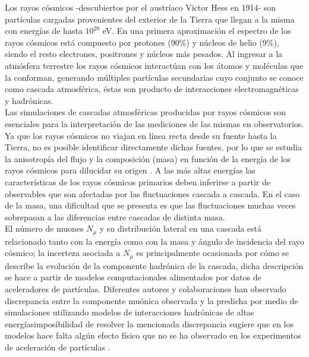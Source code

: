 \DIFdelbegin %
\DIFdelend \DIFaddbegin {}
\vspace{-5mm}

\DIFaddend 

Los rayos cósmicos -descubiertos por el austríaco Victor Hess en 1914- son partículas cargadas provenientes del exterior de la Tierra que llegan a la misma con energías de hasta $10^{20}$ eV. En una primera aproximaci\'on el espectro de los rayos c\'osmicos est\'a compuesto por protones (90\%) y núcleos de helio (9\%), siendo el resto electrones, positrones y núcleos más pesados. Al ingresar a la atmósfera terrestre los rayos c\'osmicos interactúan con los átomos y moléculas que la conforman, generando m\'ultiples partículas secundarias cuyo conjunto se conoce como cascada atmosf\'erica, éstas son producto de interacciones electromagnéticas y hadrónicas. \\

Las simulaciones de cascadas atmosf\'ericas producidas por rayos c\'osmicos son esenciales para la interpretaci\'on de las mediciones de las mismas en observatorios. Ya que los rayos c\'osmicos no viajan en l\'inea recta desde su fuente hasta la Tierra, no es posible identificar directamente dichas fuentes, por lo que se estudia la anisotrop\'ia del flujo y la composici\'on (masa) en funci\'on de la energ\'ia de los rayos c\'osmicos para dilucidar su origen \cite{Albrecht2021}. A las m\'as altas energ\'ias las caracter\'isticas de los rayos c\'osmicos primarios deben inferirse a partir de observables que son afectadas por las fluctuaciones cascada a cascada. En el caso de la masa, una dificultad que se presenta es que las fluctuaciones muchas veces sobrepasan a las diferencias entre cascadas de distinta masa. \\

El n\'umero de muones $N_{\mu}$ y su distribuci\'on lateral en una cascada est\'a relacionado tanto con la energ\'ia como con la masa y \'angulo de incidencia del rayo c\'osmico; la incerteza asociada a $N_{\mu}$ es principalmente ocasionada por c\'omo se describe la evoluci\'on de la componente hadr\'onica de la cascada, dicha descripci\'on se hace a partir de modelos computacionales alimentados por datos de aceleradores de part\'iculas. Diferentes autores y colaboraciones han observado discrepancia entre la componente mu\'onica observada y la predicha por medio de simulaciones utilizando modelos de interacciones hadr\'onicas de altas energ\'ias\DIFdelbegin {}\DIFdelend \DIFaddbegin {}\DIFaddend imposibilidad de resolver la mencionada discrepancia \DIFaddbegin {}\DIFaddend sugiere que en los modelos hace falta alg\'un efecto f\'isico que no se ha observado en los experimentos de aceleraci\'on de part\'iculas \DIFaddbegin {}\DIFaddend . \\

